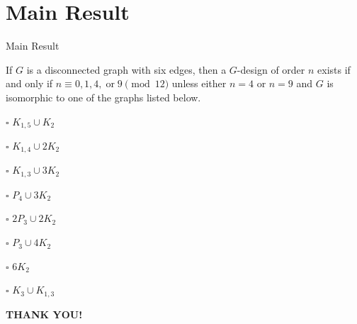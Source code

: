 \documentclass[11pt,serif,professionalfont,aspectratio=169]{beamer}
\theoremstyle{plain}
\begin{document}
\section{Main Result}
\begin{frame}{Main Result}
    \begin{theorem}
        If $G$ is a disconnected graph with six edges, then a $G$-design of order $n$ exists if and only if $n \equiv 0,1,4, \; \text{or} \; 9 \pmod{12}$ unless either $n=4$ or $n=9$ and $G$ is isomorphic to one of the graphs listed below.
        \begin{itemize}
     \begin{multicols}{2}
        \item [$\square$] $K_{1,5} \cup K_2$
        \item [$\square$]$K_{1,4} \cup 2K_2$
        \item [$\square$]$K_{1,3} \cup 3K_2$
        \item [$\square$]$P_4 \cup 3K_2$
        \item [$\square$]$2P_3 \cup 2K_2$
        \item [$\square$]$P_3 \cup 4K_2$
        \item [$\square$]$6K_2$
        \item [$\square$]$K_3 \cup K_{1,3}$
        \end{multicols}
    \end{itemize}
    \end{theorem}
    \pause
   \textbf{THANK YOU!} 
\end{frame}













\end{document}

